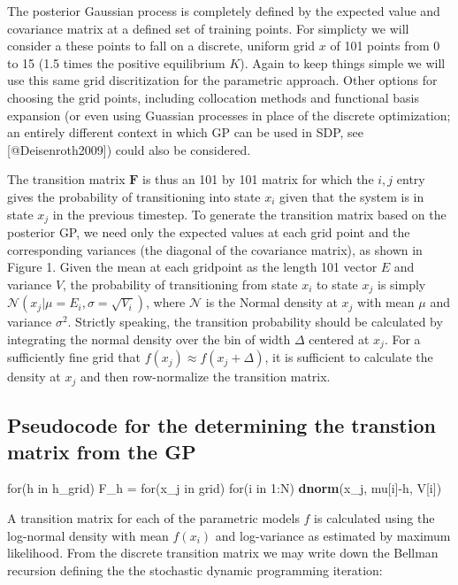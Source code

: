 \documentclass[author-year, review]{elsarticle} %
\newenvironment{Shaded}{}{}
\newcommand{\KeywordTok}[1]{\textcolor[rgb]{0.00,0.44,0.13}{\textbf{{#1}}}}
\newcommand{\DecValTok}[1]{\textcolor[rgb]{0.25,0.63,0.44}{{#1}}}
\newcommand{\StringTok}[1]{\textcolor[rgb]{0.25,0.44,0.63}{{#1}}}
\newcommand{\NormalTok}[1]{{#1}}
\begin{document}
The posterior Gaussian process is completely defined by the expected
value and covariance matrix at a defined set of training points. For
simplicty we will consider a these points to fall on a discrete, uniform
grid $x$ of 101 points from 0 to 15 (1.5 times the positive equilibrium
$K$). Again to keep things simple we will use this same grid
discritization for the parametric approach. Other options for choosing
the grid points, including collocation methods and functional basis
expansion (or even using Guassian processes in place of the discrete
optimization; an entirely different context in which GP can be used in
SDP, see {[}@Deisenroth2009{]}) could also be considered.

The transition matrix $\mathbf{F}$ is thus an 101 by 101 matrix for
which the ${i,j}$ entry gives the probability of transitioning into
state $x_i$ given that the system is in state $x_j$ in the previous
timestep. To generate the transition matrix based on the posterior GP,
we need only the expected values at each grid point and the
corresponding variances (the diagonal of the covariance matrix), as
shown in Figure 1. Given the mean at each gridpoint as the length 101
vector $E$ and variance $V$, the probability of transitioning from state
$x_i$ to state $x_j$ is simply
$\mathcal{N}\left(x_j \vert  \mu = E_i, \sigma = \sqrt{V_i}\right)$,
where $\mathcal{N}$ is the Normal density at $x_j$ with mean $\mu$ and
variance $\sigma^2$. Strictly speaking, the transition probability
should be calculated by integrating the normal density over the bin of
width $\Delta$ centered at $x_j$. For a sufficiently fine grid that
$f(x_j) \approx f(x_j + \Delta)$, it is sufficient to calculate the
density at $x_j$ and then row-normalize the transition matrix.

\subsection{Pseudocode for the determining the transtion matrix from the
GP}

\begin{Shaded}
\begin{Highlighting}[]
\NormalTok{for(h in h_grid)}
  \NormalTok{F_h =}\StringTok{ }\NormalTok{for(x_j in grid)}
          \NormalTok{for(i in }\DecValTok{1}\NormalTok{:N) }
            \KeywordTok{dnorm}\NormalTok{(x_j, mu[i]-h, V[i])}
\end{Highlighting}
\end{Shaded}

A transition matrix for each of the parametric models $f$ is calculated
using the log-normal density with mean $f(x_i)$ and log-variance as
estimated by maximum likelihood. From the discrete transition matrix we
may write down the Bellman recursion defining the the stochastic dynamic
programming iteration:
\end{document}
